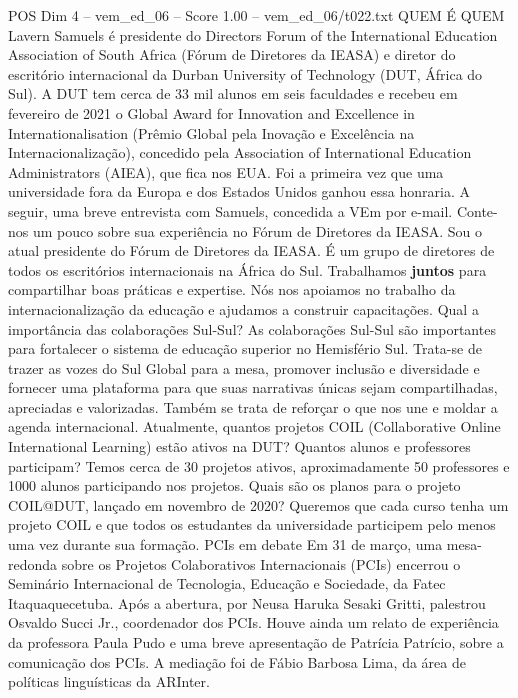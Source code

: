 \begin{textsample}{POS Dim 4 – vem\_ed\_06 – Score 1.00 – vem\_ed\_06/t022.txt}  \label{ex:f4_pos_124}
QUEM É QUEM Lavern Samuels é presidente do Directors Forum of the International Education Association of South Africa (Fórum de Diretores da IEASA) e diretor do escritório internacional da Durban University of Technology (DUT, África do Sul).
A DUT tem cerca de 33 mil alunos em seis faculdades e recebeu em fevereiro de 2021 o Global Award for Innovation and Excellence in Internationalisation (Prêmio Global pela Inovação e Excelência na Internacionalização), concedido pela Association of International Education Administrators (AIEA), que fica nos EUA.
Foi a primeira vez que uma universidade fora da Europa e dos Estados Unidos ganhou essa honraria.
A seguir, uma breve entrevista com Samuels, concedida a VEm por e-mail.
Conte-nos um pouco sobre sua experiência no Fórum de Diretores da IEASA.
Sou o atual presidente do Fórum de Diretores da IEASA.
É um grupo de diretores de todos os escritórios internacionais na África do Sul.
Trabalhamos \textbf{juntos} para compartilhar boas práticas e expertise.
Nós nos apoiamos no trabalho da internacionalização da educação e ajudamos a construir capacitações.
Qual a importância das colaborações Sul-Sul?
As colaborações Sul-Sul são importantes para fortalecer o sistema de educação superior no Hemisfério Sul.
Trata-se de trazer as vozes do Sul Global para a mesa, promover inclusão e diversidade e fornecer uma plataforma para que suas narrativas únicas sejam compartilhadas, apreciadas e valorizadas.
Também se trata de reforçar o que nos une e moldar a agenda internacional.
Atualmente, quantos projetos COIL (Collaborative Online International Learning) estão ativos na DUT?
Quantos alunos e professores participam?
Temos cerca de 30 projetos ativos, aproximadamente 50 professores e 1000 alunos participando nos projetos.
Quais são os planos para o projeto COIL@DUT, lançado em novembro de 2020?
Queremos que cada curso tenha um projeto COIL e que todos os estudantes da universidade participem pelo menos uma vez durante sua formação.
PCIs em debate Em 31 de março, uma mesa-redonda sobre os Projetos Colaborativos Internacionais (PCIs) encerrou o Seminário Internacional de Tecnologia, Educação e Sociedade, da Fatec Itaquaquecetuba.
Após a abertura, por Neusa Haruka Sesaki Gritti, palestrou Osvaldo Succi Jr., coordenador dos PCIs.
Houve ainda um relato de experiência da professora Paula Pudo e uma breve apresentação de Patrícia Patrício, sobre a comunicação dos PCIs.
A mediação foi de Fábio Barbosa Lima, da área de políticas linguísticas da ARInter.

\end{textsample}
